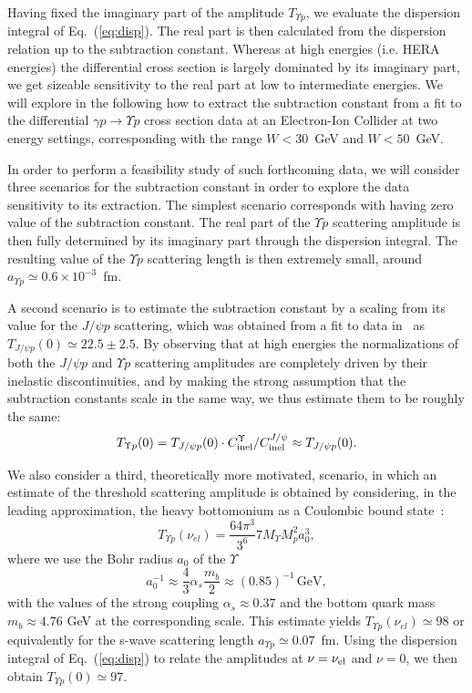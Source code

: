 \documentclass[10pt,prd,aps,nofootinbib,superscriptaddress]{revtex4}
\newcommand{\beq}{\begin{equation}}
\newcommand{\eeq}{\end{equation}}
\begin{document}
Having fixed the imaginary part of the amplitude $T_{\Upsilon p}$, we evaluate the dispersion integral of Eq.~(\ref{eq:disp}). 
The real part is then calculated from the dispersion relation up to the subtraction constant. 
Whereas at high energies (i.e. HERA energies) the differential cross section is largely dominated by its imaginary part, we get sizeable sensitivity to 
the real part at low to intermediate energies. We will explore in the following how to extract the subtraction constant from a fit to the 
 differential $\gamma p \to \Upsilon p$ cross section data at an Electron-Ion Collider at two energy settings, corresponding with the range 
 $W < 30$~GeV and $W < 50$~GeV.    

In order to perform a feasibility study of such forthcoming data, we will consider three scenarios for the subtraction constant in order to 
explore the data sensitivity to its extraction. 
The simplest scenario corresponds with having zero value of the subtraction constant. The real part of the $\Upsilon p$ scattering amplitude is then fully determined by its imaginary part through the dispersion integral. The resulting value of the $\Upsilon p$ scattering length is then extremely small, around $a_{\Upsilon p} \simeq 0.6 \times 10^{-3}$~fm. 

A second scenario is to estimate the subtraction constant by a scaling from its value for the $J/\psi p$ scattering, which was obtained from a fit to data in~\cite{Gryniuk:2016mpk} as $T_{J/\psi p }(0) \simeq 22.5 \pm 2.5$. 
By observing that at high energies the normalizations of both the $J/\psi p$ and $\Upsilon p$ scattering amplitudes are completely driven by their inelastic discontinuities, and by making the strong assumption that the subtraction constants scale in the same way, %
we thus estimate them to be roughly the same:
\beq
T_{\Upsilon p}(0) = T_{J/\psi p }(0) \cdot C_{\rm inel}^\Upsilon / C_{\rm inel}^{J/\psi} \approx T_{J/\psi p }(0).
\eeq

We also consider a third, theoretically more motivated, scenario, in which an estimate of the threshold scattering amplitude 
is obtained by considering, in the leading approximation,  the heavy bottomonium 
as a Coulombic bound state~\cite{Peskin:1979va, Kaidalov:1992hd}:
\beq
T_{\Upsilon p}(\nu_{el}) = \frac{64\pi^3}{3^6}7 M_{\Upsilon} M_p^2 a_0^3 ,
\eeq
where we use the Bohr radius $a_0$ of the $\Upsilon$
\beq
a_0^{-1} \approx \frac{4}{3}\alpha_s \frac{m_b}{2} \approx (0.85)^{-1} \,\mathrm{GeV},
\eeq
with the values of the strong coupling $\alpha_s\approx 0.37$ and the bottom quark mass $m_b\approx 4.76$ GeV
 at the corresponding scale.
This estimate yields $T_{\Upsilon p}(\nu_{el}) \simeq 98$ or equivalently for the s-wave scattering length $a_{\Upsilon p} \simeq 0.07$~fm. Using the dispersion integral of Eq.~(\ref{eq:disp}) to relate the amplitudes at $\nu = \nu_{\rm el}$ and $\nu = 0$, we then obtain 
$T_{\Upsilon p}(0) \simeq 97$. 
\end{document}
